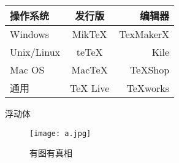 \documentclass[UTF8]{ctexart} %
\begin{document}
\begin{tabular}{|l|c|r|}
 \hline
操作系统& 发行版& 编辑器\\
 \hline
Windows & MikTeX & TexMakerX \\
 \hline
Unix/Linux & teTeX & Kile \\
 \hline
Mac OS & MacTeX & TeXShop \\
 \hline
通用& TeX Live & TeXworks \\
 \hline
\end{tabular}

浮动体


\begin{figure}[htbp]
\centering
\texttt{[image: a.jpg]}
\caption{有图有真相}
\label{fig:myphoto}
\end{figure}
\end{document}
